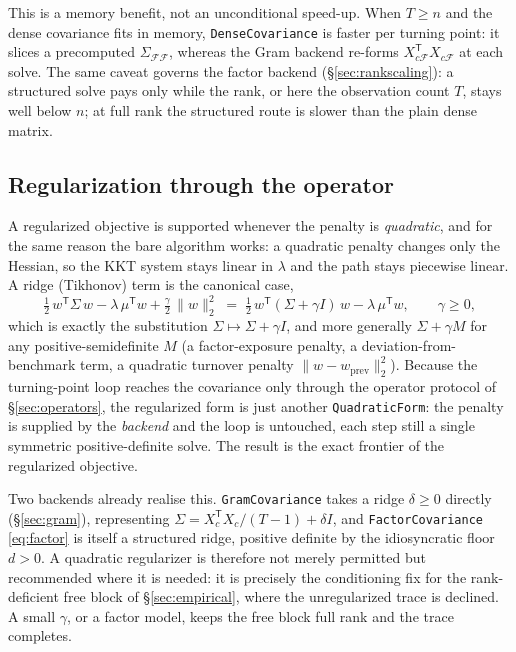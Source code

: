 \documentclass[11pt]{article}
\newcommand{\Sig}{\Sigma}
\newcommand{\F}{\mathcal{F}}        %
\newcommand{\trans}{^{\mathsf{T}}}
\begin{document}
This is a memory benefit, not an unconditional speed-up. When $T\ge n$ and the dense
covariance fits in memory, \texttt{DenseCovariance} is faster per turning point: it
slices a precomputed $\Sig_{\F\F}$, whereas the Gram backend re-forms
$X_{c\F}\trans X_{c\F}$ at each solve. The same caveat governs the factor backend
(\S\ref{sec:rankscaling}): a structured solve pays only while the rank, or here the
observation count $T$, stays well below $n$; at full rank the structured route is
slower than the plain dense matrix.

\subsection{Regularization through the operator}
\label{sec:regularization}

A regularized objective is supported whenever the penalty is \emph{quadratic}, and
for the same reason the bare algorithm works: a quadratic penalty changes only the
Hessian, so the KKT system stays linear in $\lambda$ and the path stays piecewise
linear. A ridge (Tikhonov) term is the canonical case,
\begin{equation}
\label{eq:ridge}
\tfrac12\, w\trans\Sig\, w - \lambda\,\mu\trans w + \tfrac{\gamma}{2}\,\lVert w\rVert_2^2
\;=\;
\tfrac12\, w\trans(\Sig + \gamma I)\, w - \lambda\,\mu\trans w,
\qquad \gamma \ge 0,
\end{equation}
which is exactly the substitution $\Sig \mapsto \Sig + \gamma I$, and more generally
$\Sig + \gamma M$ for any positive-semidefinite $M$ (a factor-exposure penalty, a
deviation-from-benchmark term, a quadratic turnover penalty
$\lVert w - w_{\text{prev}}\rVert_2^2$). Because the turning-point loop reaches the
covariance only through the operator protocol of \S\ref{sec:operators}, the
regularized form is just another \texttt{QuadraticForm}: the penalty is supplied by
the \emph{backend} and the loop is untouched, each step still a single symmetric
positive-definite solve. The result is the exact frontier of the regularized
objective.

Two backends already realise this. \texttt{GramCovariance} takes a ridge
$\delta \ge 0$ directly (\S\ref{sec:gram}), representing
$\Sig = X_c\trans X_c/(T-1) + \delta I$, and \texttt{FactorCovariance}
\eqref{eq:factor} is itself a structured ridge, positive definite by the
idiosyncratic floor $d > 0$. A quadratic regularizer is therefore not merely
permitted but recommended where it is needed: it is precisely the conditioning fix
for the rank-deficient free block of \S\ref{sec:empirical}, where the unregularized
trace is declined. A small $\gamma$, or a factor model, keeps the free block full
rank and the trace completes.
\end{document}
